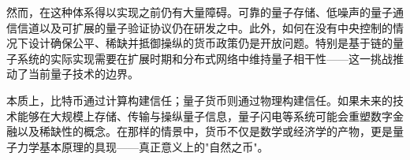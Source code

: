 \documentclass[a4paper,10.5pt,twoside]{article}
\begin{document}
然而，在这种体系得以实现之前仍有大量障碍。可靠的量子存储、低噪声的量子通信信道以及可扩展的量子验证协议仍在研发之中。此外，如何在没有中央控制的情况下设计确保公平、稀缺并抵御操纵的货币政策仍是开放问题。特别是基于链的量子系统的实际实现需要在扩展时期和分布式网络中维持量子相干性——这一挑战推动了当前量子技术的边界。

本质上，比特币通过计算构建信任；量子货币则通过物理构建信任。如果未来的技术能够在大规模上存储、传输与操纵量子信息，量子闪电等系统可能会重塑数字金融以及稀缺性的概念。在那样的情景中，货币不仅是数学或经济学的产物，更是量子力学基本原理的具现——真正意义上的"自然之币"。

\printbibliography
\end{document}
